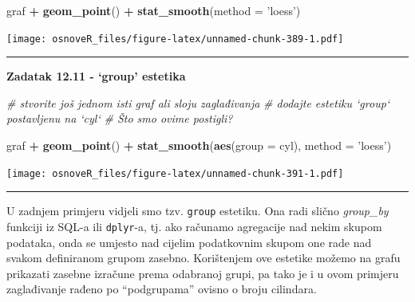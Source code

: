 \documentclass[]{book}
\newenvironment{Shaded}{\begin{snugshade}}{\end{snugshade}}
\newcommand{\KeywordTok}[1]{\textcolor[rgb]{0.13,0.29,0.53}{\textbf{#1}}}
\newcommand{\DataTypeTok}[1]{\textcolor[rgb]{0.13,0.29,0.53}{#1}}
\newcommand{\StringTok}[1]{\textcolor[rgb]{0.31,0.60,0.02}{#1}}
\newcommand{\CommentTok}[1]{\textcolor[rgb]{0.56,0.35,0.01}{\textit{#1}}}
\newcommand{\OperatorTok}[1]{\textcolor[rgb]{0.81,0.36,0.00}{\textbf{#1}}}
\newcommand{\NormalTok}[1]{#1}
\theoremstyle{definition}
\theoremstyle{definition}
\theoremstyle{definition}
\theoremstyle{remark}
\begin{document}
\begin{Shaded}
\begin{Highlighting}[]
\NormalTok{graf }\OperatorTok{+}\StringTok{ }\KeywordTok{geom_point}\NormalTok{() }\OperatorTok{+}\StringTok{ }\KeywordTok{stat_smooth}\NormalTok{(}\DataTypeTok{method =} \StringTok{'loess'}\NormalTok{)}
\end{Highlighting}
\end{Shaded}

\texttt{[image: osnoveR\_files/figure-latex/unnamed-chunk-389-1.pdf]}

\begin{center}\rule{0.5\linewidth}{\linethickness}\end{center}

\textbf{Zadatak 12.11 - `group' estetika}

\begin{Shaded}
\begin{Highlighting}[]
\CommentTok{# stvorite još jednom isti graf ali sloju zaglađivanja}
\CommentTok{# dodajte estetiku `group` postavljenu na `cyl`}
\CommentTok{# Što smo ovime postigli?}
\end{Highlighting}
\end{Shaded}

\begin{Shaded}
\begin{Highlighting}[]
\NormalTok{graf }\OperatorTok{+}\StringTok{ }\KeywordTok{geom_point}\NormalTok{() }\OperatorTok{+}\StringTok{ }\KeywordTok{stat_smooth}\NormalTok{(}\KeywordTok{aes}\NormalTok{(}\DataTypeTok{group =}\NormalTok{ cyl), }\DataTypeTok{method =} \StringTok{'loess'}\NormalTok{)}
\end{Highlighting}
\end{Shaded}

\texttt{[image: osnoveR\_files/figure-latex/unnamed-chunk-391-1.pdf]}

\begin{center}\rule{0.5\linewidth}{\linethickness}\end{center}

U zadnjem primjeru vidjeli smo tzv. \texttt{group} estetiku. Ona radi
slično \emph{group\_by} funkciji iz SQL-a ili \texttt{dplyr}-a, tj. ako
računamo agregacije nad nekim skupom podataka, onda se umjesto nad
cijelim podatkovnim skupom one rade nad svakom definiranom grupom
zasebno. Korištenjem ove estetike možemo na grafu prikazati zasebne
izračune prema odabranoj grupi, pa tako je i u ovom primjeru
zaglađivanje rađeno po ``podgrupama'' ovisno o broju cilindara.
\end{document}
